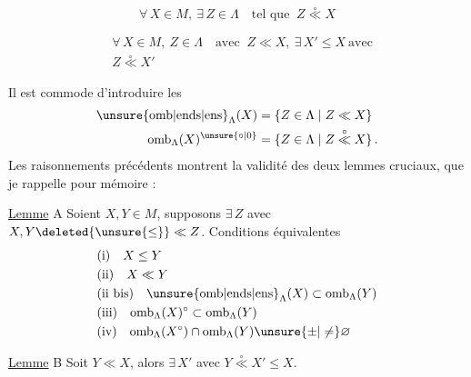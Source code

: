 \[
 \forall\,X\in M,\ \exists\,Z\in\Lambda\quad\text{tel que }\ Z\mathrel{\overset{\circ}{\ll}}X
 \tag*{$\mathrm M\Lambda\,2$}
\]

\[
 \begin{aligned}
 &\forall\,X\in M,\ Z\in\Lambda\quad\text{avec }\ Z\ll X,\ \exists\,X'\leq X\ \text{avec}\\
 &Z\mathrel{\overset{\circ}{\ll}}X'
 \end{aligned}
 \tag*{$\mathrm M\Lambda\,3$}
\]
\endgroup

 Il est commode d'introduire les
\[
 \begin{aligned}
 \unsure{\mathrm{omb}|\mathrm{ends}|\mathrm{ens}}_{\Lambda}(X)
    &=\{Z\in\Lambda\mid Z\ll X\}\\
 \mathrm{omb}_{\Lambda}(X)^{\unsure{\circ|0}}
    &=\{Z\in\Lambda\mid Z\mathrel{\overset{\circ}{\ll}} X\}\,.
 \end{aligned}
\]
Les raisonnements précédents montrent la validité des deux lemmes cruciaux, que je rappelle pour mémoire :

\uline{Lemme} A Soient $X,Y\in M$, supposons $\exists\,Z$ avec $X,Y\deleted{\unsure{\leq}}\ll Z$. Conditions équivalentes
\[
 \begin{aligned}
 &\text{(i)}\quad X\leq Y\\
 &\text{(ii)}\quad X\ll Y\\
 &\text{(ii bis)}\quad\unsure{\mathrm{omb}|\mathrm{ends}|\mathrm{ens}}_{\Lambda}(X)\subset\mathrm{omb}_{\Lambda}(Y)\\
 &\text{(iii)}\quad\mathrm{omb}_{\Lambda}(X)^{\circ}\subset\mathrm{omb}_{\Lambda}(Y)\\
 &\text{(iv)}\quad\mathrm{omb}_{\Lambda}(X^{\circ})\cap\mathrm{omb}_{\Lambda}(Y)\unsure{\pm|\ne}\varnothing
 \end{aligned}
\]

\uline{Lemme} B Soit $Y\ll X$, alors $\exists\,X'$ avec $Y\mathrel{\overset{\circ}{\ll}}X'\leq X$.

